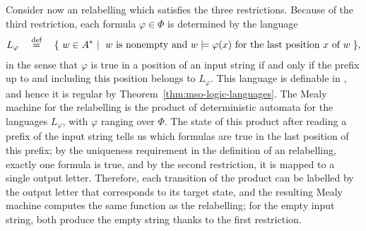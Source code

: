 {    Consider now an \mso relabelling which satisfies the three restrictions. Because of the third restriction, each formula $\varphi \in \Phi$ is determined by the language
    \begin{align*}
    L_\varphi \quad \eqdef \quad \setbuild{w \in A^*}{$w$ is nonempty and $w \models \varphi(x)$ for the last position $x$ of $w$},
    \end{align*}
    in the sense that $\varphi$ is true in a position of an input string if and only if the prefix up to and including this position belongs to $L_\varphi$. This language is definable in \mso, and hence it is regular by Theorem~\ref{thm:mso-logic-languages}. The Mealy machine for the relabelling is the product of deterministic automata for the languages $L_\varphi$, with $\varphi$ ranging over $\Phi$. The state of this product after reading a prefix of the input string tells us which formulas are true in the last position of this prefix; by the uniqueness requirement in the definition of an \mso relabelling, exactly one formula is true, and by the second restriction, it is mapped to a single output letter. Therefore, each transition of the product can be labelled by the output letter that corresponds to its target state, and the resulting Mealy machine computes the same function as the relabelling; for the empty input string, both produce the empty string thanks to the first restriction.
}
